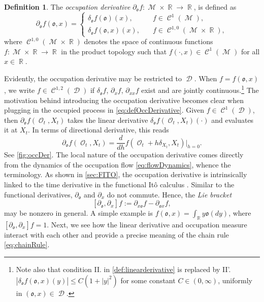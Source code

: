 \documentclass[11pt]{article}
\def\mo{\mathfrak{o}}
\theoremstyle{plain}
\theoremstyle{definition}
\newtheorem{definition}{Definition}
\DeclareMathOperator{\R}{\mathbb{R}}
\DeclareMathOperator{\calC}{\mathcal{C}}
\DeclareMathOperator{\calD}{\mathcal{D}}
\DeclareMathOperator{\calM}{\mathcal{M}}
\DeclareMathOperator{\calO}{\mathcal{O}}
\begin{document}
\begin{definition}\label{def:occDerivative}
    The \textit{occupation derivative} $\partial_{\mo} f: \calM \times  \R \to \R$, is   defined as %
    \begin{equation}\label{eq:defOccDerivative}
    \partial_{\mo}f(\mo,x) = \begin{cases}
        \delta_\mo  f(\mo)(x), \quad & f\in \calC^{1}(\calM), \\[0.5em]
        \delta_\mo  f(\mo,x)(x), \quad  & f\in \calC^{1,0}(\calM \times \R),
    \end{cases}  
\end{equation}
where $\calC^{1,0}(\calM \times \R)$ denotes the space of continuous functions $f:\calM \times \R\to \R $ in the product topology such that $f(\cdot,x)\in \calC^1(\calM)$ for all $x\in \R$. 
\end{definition} 
Evidently, the occupation derivative may be restricted to   $\calD$. When $f = f(\mo,x)$, we  write $f\in \calC^{1,2}(\calD)$ if $\delta_{\mo} f$, $\partial_x f$, $\partial_{xx} f$   exist and are jointly continuous.\footnote{Note also  that condition II. in \cref{def:linearderivative} is replaced by II'.  $|\delta_\mo  f(\mo,x)(y)| \le C(1+|y|^2)$ for some constant $C\in (0,\infty)$, uniformly in $(\mo,x)\in \calD$.}  
The motivation behind introducing the occupation derivative 
becomes clear when plugging in  the occupied process in \eqref{eq:defOccDerivative}. Given  $f\in \calC^{1}(\calD)$, then  
$\partial_{\mo} f(\calO_t,X_t)$ takes the linear derivative $\delta_\mo  f(\calO_t,X_t)(\cdot)$ and evaluates it at  $X_t$. 
In terms of directional derivative, this reads $$\partial_{\mo} f(\calO_t,X_t) =  \frac{d}{dh} f(\calO_t+h\delta_{X_t},X_t)|_{h=0}.$$
See \cref{fig:occDer}. The local nature of the occupation derivative comes directly from the  dynamics of the occupation flow  \eqref{eq:flowDynamics}, whence the terminology. 
As shown in \cref{sec:FITO}, the occupation derivative is intrinsically linked to the time derivative in the functional It\^o calculus \cite{DupireFITO}. Similar to the functional derivatives, $\partial_{\mo}$ and $\partial_x$ do not commute. Hence, the \textit{Lie bracket} $$[\partial_{\mo},\partial_x]f := \partial_{x\mo}f - \partial_{\mo x}f,$$ may be  nonzero in general. 
A simple example is $f(\mo,x) = \int_{\R}y \mo(dy)$, where $[\partial_{\mo},\partial_x]f = 1$. %
Next, we  see how the linear derivative and occupation measure interact with each other and provide a precise meaning of the chain rule \eqref{eq:chainRule}. 
\end{document}
